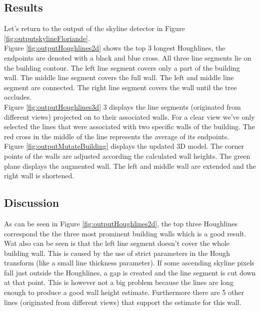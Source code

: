 \subsection{Results}
Let's return to the output of the skyline detector in Figure
\ref{fig:outputskylineFloriande}.\\
Figure \ref{fig:outputHoughlines2d} shows the top 3 longest Houghlines, the
endpoints are denoted with a black and blue cross. All three line segments lie on the
building contour.  The left line segment covers only a part of the building wall. The
middle line segment covers the full wall. The left and middle line segment are connected. The
right line segment covers the wall until the tree occludes.\\
Figure \ref{fig:outputHoughlines3d} 
3 displays the line segments (originated from
different views) projected on to their associated walls.  For a clear view we've
only selected the lines that were associated with two specific walls of the building.  
The red cross in the middle of the line represents the average of its endpoints.\\
Figure \ref{fig:outputMutateBuilding} 
displays the updated 3D model. The
corner points of the walls are adjusted according the calculated wall heights.
The green plane displays the augmented wall. The left and middle wall are extended
and the right wall is shortened.\\


\subsection{Discussion}

As can be seen in Figure \ref{fig:outputHoughlines2d}, 
the top three Houghlines correspond the the three most prominent building walls
which is a good result. Wat also can be seen is that the left line segment doesn't cover the whole
building wall. This is caused by the use of strict parameters in the Hough transform
(like a small line thickness parameter).  If some ascending skyline pixels fall just outside
the Houghlines, a gap is created and the line segment is cut down at that point.
This is however not a big problem because the lines are long enough to produce a
good wall height estimate. Furthermore there are 5 other lines
(originated from different views) that support the estimate for this wall.\\


